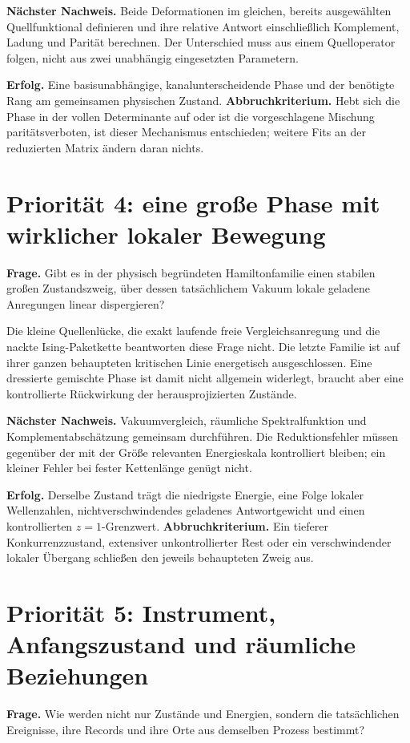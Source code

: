 \documentclass[11pt,a4paper,oneside,parskip=half,headings=normal,numbers=noenddot,bibliography=totoc]{scrreprt}
\begin{document}
\textbf{Nächster Nachweis.} Beide Deformationen im gleichen, bereits ausgewählten Quellfunktional definieren und ihre relative Antwort einschließlich Komplement, Ladung und Parität berechnen. Der Unterschied muss aus einem Quelloperator folgen, nicht aus zwei unabhängig eingesetzten Parametern.

\textbf{Erfolg.} Eine basisunabhängige, kanalunterscheidende Phase und der benötigte Rang am gemeinsamen physischen Zustand. \textbf{Abbruchkriterium.} Hebt sich die Phase in der vollen Determinante auf oder ist die vorgeschlagene Mischung paritätsverboten, ist dieser Mechanismus entschieden; weitere Fits an der reduzierten Matrix ändern daran nichts.

\section{Priorität 4: eine große Phase mit wirklicher lokaler Bewegung}
\textbf{Frage.} Gibt es in der physisch begründeten Hamiltonfamilie einen stabilen großen Zustandszweig, über dessen tatsächlichem Vakuum lokale geladene Anregungen linear dispergieren?

Die kleine Quellenlücke, die exakt laufende freie Vergleichsanregung und die nackte Ising-Paketkette beantworten diese Frage nicht. Die letzte Familie ist auf ihrer ganzen behaupteten kritischen Linie energetisch ausgeschlossen. Eine dressierte gemischte Phase ist damit nicht allgemein widerlegt, braucht aber eine kontrollierte Rückwirkung der herausprojizierten Zustände.

\textbf{Nächster Nachweis.} Vakuumvergleich, räumliche Spektralfunktion und Komplementabschätzung gemeinsam durchführen. Die Reduktionsfehler müssen gegenüber der mit der Größe relevanten Energieskala kontrolliert bleiben; ein kleiner Fehler bei fester Kettenlänge genügt nicht.

\textbf{Erfolg.} Derselbe Zustand trägt die niedrigste Energie, eine Folge lokaler Wellenzahlen, nichtverschwindendes geladenes Antwortgewicht und einen kontrollierten $z=1$-Grenzwert. \textbf{Abbruchkriterium.} Ein tieferer Konkurrenzzustand, extensiver unkontrollierter Rest oder ein verschwindender lokaler Übergang schließen den jeweils behaupteten Zweig aus.

\section{Priorität 5: Instrument, Anfangszustand und räumliche Beziehungen}
\textbf{Frage.} Wie werden nicht nur Zustände und Energien, sondern die tatsächlichen Ereignisse, ihre Records und ihre Orte aus demselben Prozess bestimmt?
\end{document}
